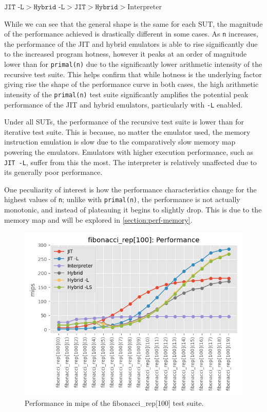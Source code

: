 $\texttt{JIT -L} > \texttt{Hybrid -L} > \texttt{JIT} > \texttt{Hybrid} > \text{Interpreter}$

While we can see that the general shape is the same for each SUT, the magnitude of the performance achieved is drastically different in some cases. As \texttt{n} increases, the performance of the JIT and hybrid emulators is able to rise significantly due to the increased program hotness, however it peaks at an order of magnitude lower than for \texttt{primal(n)} due to the significantly lower arithmetic intensity of the recursive test suite. This helps confirm that while hotness is the underlying factor giving rise the shape of the performance curve in both cases, the high arithmetic intensity of the \texttt{primal(n)} test suite significantly amplifies the potential peak performance of the JIT and hybrid emulators, particularly with \texttt{-L} enabled.

Under all SUTs, the performance of the recursive test suite is lower than for iterative test suite. This is because, no matter the emulator used, the memory instruction emulation is slow due to the comparatively slow memory map powering the emulators. Emulators with higher execution performance, such as \texttt{JIT -L}, suffer from this the most. The interpreter is relatively unaffected due to its generally poor performance.

One peculiarity of interest is how the performance characteristics change for the highest values of \texttt{n}; unlike with \texttt{primal(n)}, the performance is not actually monotonic, and instead of plateauing it begins to slightly drop. This is due to the memory map and will be explored in \autoref{section:perf-memory}.

\begin{figure}[H]
    \centering
    \includegraphics[scale=0.75]{output/graphs/tests/all/fibonacci_rep[100]/mips.png}
    \caption{Performance in mips of the fibonacci\_rep[100] test suite.}
    \label{figure:fibonacci-100-mips}
\end{figure}

